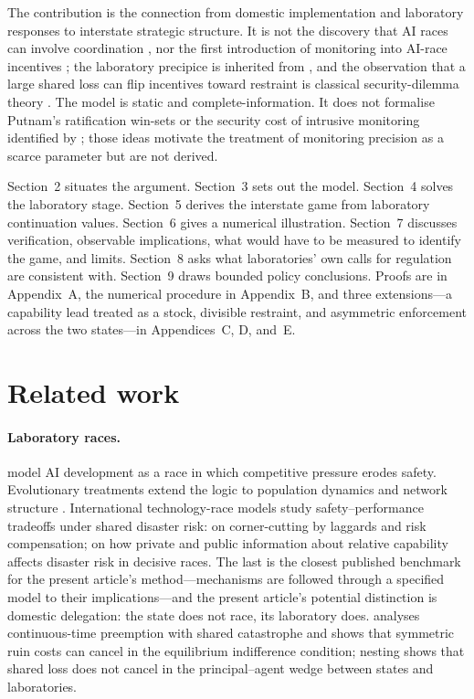 \documentclass[11pt]{article}
\theoremstyle{plain}
\theoremstyle{definition}
\theoremstyle{remark}
\begin{document}
The contribution is the connection from domestic implementation and laboratory responses to interstate strategic structure. It is not the discovery that AI races can involve coordination \citep{abraham2025}, nor the first introduction of monitoring into AI-race incentives \citep{bova2023}; the laboratory precipice is inherited from \citet{armstrong2016}, and the observation that a large shared loss can flip incentives toward restraint is classical security-dilemma theory \citep{jervis1978,snyder1971}. The model is static and complete-information. It does not formalise Putnam's ratification win-sets or the security cost of intrusive monitoring identified by \citet{coe2020}; those ideas motivate the treatment of monitoring precision as a scarce parameter but are not derived.

Section~2 situates the argument. Section~3 sets out the model. Section~4 solves the laboratory stage. Section~5 derives the interstate game from laboratory continuation values. Section~6 gives a numerical illustration. Section~7 discusses verification, observable implications, what would have to be measured to identify the game, and limits. Section~8 asks what laboratories' own calls for regulation are consistent with. Section~9 draws bounded policy conclusions. Proofs are in Appendix~A, the numerical procedure in Appendix~B, and three extensions---a capability lead treated as a stock, divisible restraint, and asymmetric enforcement across the two states---in Appendices~C, D, and~E.

\section{Related work}

\paragraph{Laboratory races.} \citet{armstrong2016} model AI development as a race in which competitive pressure erodes safety. Evolutionary treatments extend the logic to population dynamics and network structure \citep{han2020,cimpeanu2022}. International technology-race models study safety--performance tradeoffs under shared disaster risk: \citet{stafford2022} on corner-cutting by laggards and risk compensation; \citet{emery2024} on how private and public information about relative capability affects disaster risk in decisive races. The last is the closest published benchmark for the present article's method---mechanisms are followed through a specified model to their implications---and the present article's potential distinction is domestic delegation: the state does not race, its laboratory does. \citet{tan2025} analyses continuous-time preemption with shared catastrophe and shows that symmetric ruin costs can cancel in the equilibrium indifference condition; nesting shows that shared loss does not cancel in the principal--agent wedge between states and laboratories.
\end{document}
